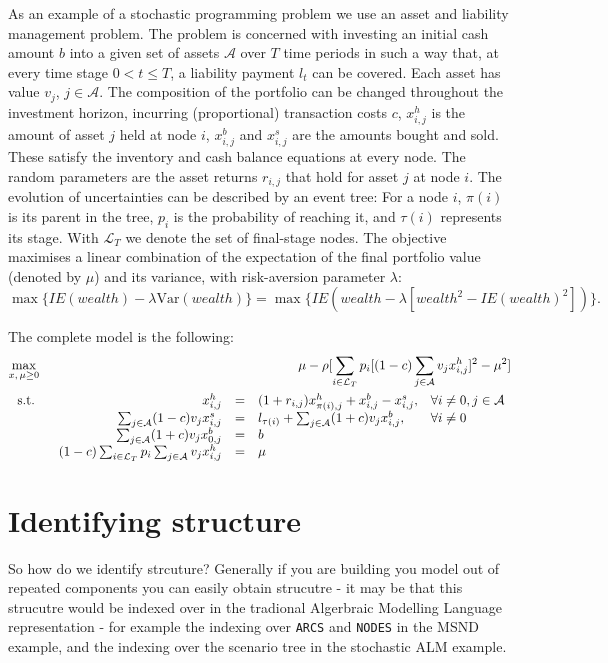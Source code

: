 \documentclass[10pt,a4paper]{book}
\newcommand{\E}{\mbox{$I\!\!E$}}
\newcommand{\Var}{\mathrm{Var}}
\begin{document}
As an example of a stochastic programming problem we use an asset and
liability management problem.
The problem is concerned with investing an initial cash amount $b$ into
a given set of assets $\mathcal{A}$ over $T$ time periods in such a way
that, at every time stage $0 < t \le T$, a liability payment $l_t$ 
can be covered.
Each asset has value $v_j$, $j\in\mathcal{A}$.
The composition of the portfolio can be changed throughout the investment
horizon, incurring (proportional) transaction costs $c$,
$x_{i,j}^h$ is the amount of asset $j$ held at node $i$,
$x_{i,j}^b$ and $x_{i,j}^s$ are the amounts bought and sold.
These satisfy the inventory and cash balance equations at every node.
The random parameters are the asset returns $r_{i,j}$ that hold
for asset $j$ at node $i$.
The evolution of uncertainties can be described by an event tree:
For a node $i$, $\pi(i)$ is its parent in the tree,
$p_i$ is the probability of reaching it, 
and $\tau(i)$ represents its stage.
With $\mathcal{L}_T$ we denote the set of final-stage nodes.
%
The objective maximises a linear combination of the expectation of the final
portfolio value (denoted by $\mu$) and its variance, with risk-aversion
parameter $\lambda$:
\[
 \max \{\E(wealth) - \lambda\Var(wealth)\} = 
 \max \{\E\left(wealth - \lambda \left[wealth^2 - \E(wealth)^2\right]\right)\}.
\]


The complete model is the following:
\begin{eqnarray}
\max_{x,\,\mu\ge 0}&& \mu - \rho[\sum_{i\in\mathcal{L}_T}
p_i [(1-c)\sum_{j\in\mathcal{A}} v_j x_{i,j}^h]^2 - \mu^2]\notag\\
\text{~s.t.~}&&
\begin{array}[t]{rcll}
x_{i,j}^h &=& (1+r_{i,j})x_{\pi(i),j}^h +  x_{i,j}^b - x_{i,j}^s,&\forall i\ne 0, j\in\mathcal{A}\\
\sum_{j\in\mathcal{A}} (1-c) v_j x_{i,j}^s &=& l_{\tau(i)} + \sum_{j\in\mathcal{A}} (1+c) v_j x_{i,j}^b, &\forall i\ne 0\\ 
\sum_{j\in\mathcal{A}} (1+c) v_j x_{0,j}^b &=& b\\
 (1-c) \sum_{i\in \mathcal{L}_T} p_i\sum_{j\in\mathcal{A}} v_j x_{i,j}^h &=& \mu
\end{array}
\label{alm}
\end{eqnarray}

\section{Identifying structure}

So how do we identify strcuture? Generally if you are building you model out
of repeated components you can easily obtain strucutre - it may be that this
strucutre would be indexed over in the tradional Algerbraic Modelling Language
representation - for example the indexing over {\tt ARCS} and {\tt NODES} in
the MSND example, and the indexing over the scenario tree in the stochastic
ALM example.
\end{document}

